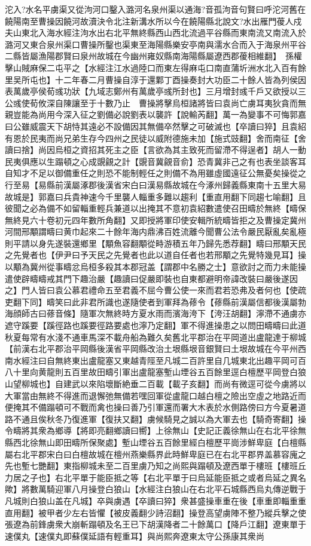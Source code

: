 沱入?水名平虜渠又從泃河口鑿入潞河名泉州渠以通海?音孤泃音句賢曰呼沱河舊在饒陽南至曹操因饒河故瀆決令北注新溝水所以今在饒陽縣北說文?水出雁門葰人戍夫山東北入海水經注泃水出右北平無終縣西山西北流過平谷縣而東南流又南流入於潞河又東合泉州渠口曹操所鑿也渠東至海陽縣樂安亭南與濡水合而入于海泉州平谷二縣皆屬漁陽郡賢曰泉州故城在今幽州雍奴縣南海陽縣屬遼西郡葰相維翻】　孫權擊山賊麻保二屯平之【水經注江水過陸口而東左得麻屯口南直蒲圻洲水北入百有餘里吴所屯也】十二年春二月曹操自淳于還鄴丁酉操奏封大功臣二十餘人皆為列侯因表萬歲亭侯荀彧功狀【九域志鄭州有萬歲亭彧所封也】三月增封彧千戶又欲授以三公彧使荀攸深自陳讓至于十數乃止　曹操將擊烏桓諸將皆曰袁尚亡虜耳夷狄貪而無親豈能為尚用今深入征之劉備必說劉表以襲許【說輸芮翻】萬一為變事不可悔郭嘉曰公雖威震天下胡恃其遠必不設備因其無備卒然擊之可破滅也【卒讀曰猝】且袁紹有恩於民夷而尚兄弟生存今四州之民徒以威附德施未加【施式豉翻】舍而南征【舍讀曰捨】尚因烏桓之資招其死主之臣【言欲為其主致死而留滯不得逞者】胡人一動民夷俱應以生蹋頓之心成覬覦之計【覬音冀覦音俞】恐青冀非己之有也表坐談客耳自知才不足以御備重任之則恐不能制輕任之則備不為用雖虛國遠征公無憂矣操從之行至易【易縣前漢屬涿郡後漢省宋白曰漢易縣故城在今涿州歸義縣東南十五里大易故城是】郭嘉曰兵貴神速今千里襲人輜重多難以趨利【重直用翻下同趨七喻翻】且彼聞之必為備不如留輜重輕兵兼道以出掩其不意初袁紹數遣使召田疇於無終【疇保無終見六十卷初元四年數所角翻】又即授將軍印使安輯所統疇皆拒之及曹操定冀州河間邢顒謂疇曰黄巾起來二十餘年海内鼎沸百姓流離今聞曹公法令嚴民厭亂矣亂極則平請以身先遂裝還鄉里【顒魚容翻顒從畤游積五年乃歸先悉荐翻】疇曰邢顒天民之先覺者也【伊尹曰予天民之先覺者也此以道自任者也若邢顒之先覺特幾見耳】操以顒為冀州從事疇忿烏桓多殺其本郡冠盖【謂郡中名勝之士】意欲討之而力未能操遣使辟疇疇戒其門下趣治嚴【趣讀曰促嚴即裝也自東都避明帝諱改裝曰嚴後遂因之】門人皆曰袁公慕君禮命五至君義不屈今曹公使一來而君若恐弗及者何也【使疏吏翻下同】疇笑曰此非君所識也遂隨使者到軍拜為蓚令【蓚縣前漢屬信都後漢屬勃海顔師古曰蓚音條】隨軍次無終時方夏水雨而濱海洿下【洿汪胡翻】濘滯不通虜亦遮守蹊要【蹊徑路也蹊要徑路要處也濘乃定翻】軍不得進操患之以問田疇疇曰此道秋夏每常有水淺不通車馬深不載舟船為難久矣舊北平郡治在平岡道出盧龍達于柳城【前漢右北平郡治平岡縣後漢省平岡縣改治土垠縣垠音銀賢曰土垠故城在今平州西南水經注曰自無終東出盧龍塞又東越青陘至凡城二百許里自几城東北出趣平岡可百八十里向黄龍則五百里故田疇引軍出盧龍塞塹山堙谷五百餘里逕白檀歷平岡登白狼山望柳城也】自建武以來陷壞斷絶垂二百載【載子亥翻】而尚有微逕可從今虜將以大軍當由無終不得進而退懈弛無備若嘿回軍從盧龍口越白檀之險出空虛之地路近而便掩其不備蹋頓可不戰而禽也操曰善乃引軍還而署大木表於水側路傍曰方今夏暑道路不通且俟秋冬乃復進軍【復扶又翻】虜候騎見之誠以為大軍去也【騎奇寄翻】操令疇將其衆為鄉導【將即亮翻鄉讀曰嚮】上徐無山【史記正義徐無山在右北平徐無縣西北徐無山即田疇所保聚處】塹山堙谷五百餘里經白檀歷平崗涉鮮卑庭【白檀縣屬右北平郡宋白曰白檀故城在檀州燕樂縣界此時鮮卑庭已在右北平郡界盖慕容廆之先也塹七艷翻】東指柳城未至二百里虜乃知之尚熙與蹋頓及遼西單于樓班【樓班丘力居之子也】右北平單于能臣抵之等【右北平單于曰烏延能臣抵之或者烏延之異名歟】將數萬騎迎軍八月操登白狼山【水經注白狼山在右北平石城縣西烏丸傳逆戰于凡城則白狼山盖在凡城】卒與虜遇【卒讀曰猝】衆甚盛操車重在後【車重即輜重重直用翻】被甲者少左右皆懼【被皮義翻少詩沼翻】操登高望虜陣不整乃縱兵擊之使張遼為前鋒虜衆大崩斬蹋頓及名王已下胡漢降者二十餘萬口【降戶江翻】遼東單于速僕丸【速僕丸即蘇僕延語有輕重耳】與尚熙奔遼東太守公孫康其衆尚